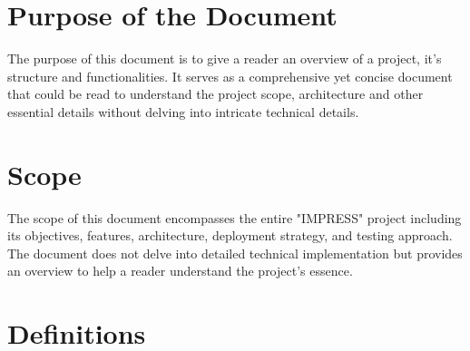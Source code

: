 \documentclass{report}
\begin{document}
\section{Purpose of the Document}
The purpose of this document is to give a reader an overview of a project, it's structure and functionalities. It serves as a comprehensive yet concise document that could be read to understand the project scope, architecture and other essential details without delving into intricate technical details.

\section{Scope}
The scope of this document encompasses the entire "IMPRESS" project including its objectives, features, architecture, deployment strategy, and testing approach. The document does not delve into detailed technical implementation but provides an overview to help a reader understand the project's essence.

\section{Definitions}
\end{document}
